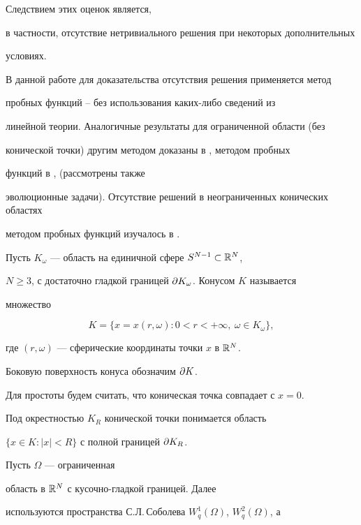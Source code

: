 Следствием этих оценок является,


в частности, отсутствие нетривиального решения при некоторых дополнительных


условиях.





В данной работе для доказательства отсутствия решения применяется метод


пробных функций \cite{K3}--\cite{MP2} без использования каких-либо сведений из


линейной теории. Аналогичные результаты для ограниченной области (без


конической точки) другим методом доказаны в \cite{BC}, методом пробных


функций в \cite{Mitidieri/Pohozaev:book}, \cite{Laptev2} (рассмотрены также


эволюционные задачи). Отсутствие решений в неограниченных конических областях


методом пробных функций изучалось в \cite{Laptev1}.





Пусть $K_\omega$ --- область на единичной сфере $S^{N-1}\subset{\Bbb R^N}$,


$N\ge3$, с достаточно гладкой границей $\partial K_\omega$. Конусом $K$ называется


множество


$$


K=\{x=x(r,\omega): 0<r<+\infty,\ \omega\in K_\omega\},


$$


где $(r,\omega)$ --- сферические координаты точки $x$ в ${\Bbb R^N}$.


Боковую поверхность конуса обозначим $\partial K$.





Для простоты будем считать, что коническая точка совпадает с $x=0$.


Под окрестностью $K_R$ конической точки понимается область


$\{x\in K:|x|<R\}$ с полной границей $\partial K_R$.





Пусть $\Omega$ --- ограниченная 


область в $\Bbb R^N$ с кусочно-гладкой границей. Далее


используются пространства С.Л.\,Соболева $W^1_q(\Omega)$, $W^2_q(\Omega)$, а


